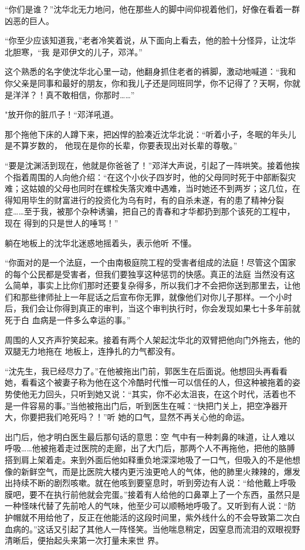 \documentclass{article}
\begin{document}
“你们是谁？”沈华北无力地问，他在那些人的脚中间仰视着他们，好像在看着一群凶恶的巨人。

“你至少应该知道我，”老者冷笑着说，从下面向上看去，他的脸十分怪异，让沈华北胆寒，“我
是邓伊文的儿子，邓洋。” 

这个熟悉的名字使沈华北心里一动，他翻身抓住老者的裤脚，激动地喊道：“我和你父亲是同事和最好的朋友，你和我儿子还是同班同学，你不记得了？天啊，你就是洋洋？！真不敢相信，你那时……”


\newpage

"放开你的脏爪子！“邓洋吼道。 

那个拖他下床的人蹲下来，把凶悍的脸凑近沈华北说：“听着小子，冬眠的年头儿是不算岁数的，
他现在是你的长辈，你要表现出对长辈的尊敬。” 

“要是沈渊活到现在，他就是你爸爸了！”邓洋大声说，引起了一阵哄笑。接着他挨个指着周围的人向他介绍：“在这个小伙子四岁时，他的父母同时死于中部断裂灾难；这姑娘的父母也同时在螺栓失落灾难中遇难，当时她还不到两岁；这几位，在得知用毕生的财富进行的投资化为乌有时，有的自杀未遂，有的患了精神分裂症……至于我，被那个杂种诱骗，把自己的青春和才华都扔到那个该死的工程中，现在
得到的只是世人的唾骂！” 

躺在地板上的沈华北迷惑地摇着头，表示他听
不懂。 

“你面对的是一个法庭，一个由南极庭院工程的受害者组成的法庭！尽管这个国家的每个公民都是受害者，但我们要独享这种惩罚的快感。真正的法庭
\newpage
当然没有这么简单，事实上比你们那时还要复杂得多，所以我们才不会把你送到那里去，让他们和那些律师扯上一年屁话之后宣布你无罪，就像他们对你儿子那样。一个小时后，我们会让你得到真正的审判，当这个审判执行时，你会发现如果七十多年前就死于白
血病是一件多么幸运的事。” 

周围的人又齐声狞笑起来。接着有两个人架起沈华北的双臂把他向门外拖去，他的双腿无力地拖在
地板上，连挣扎的力气都没有。 

“沈先生，我已经尽力了。”在他被拖出门前，郭医生在后面说。他想回头再看看她，看看这个被妻子称为他在这个冷酷时代惟一可以信任的人，但这种被拖着的姿势使他无力回头，只听到她又说：“其实，你不必太沮丧，在这个时代，活着也不是一件容易的事。”当他被拖出门后，听到医生在喊：“快把门关上，把空净器开大，你要把我们呛死吗？！”听
她的口气，显然不再关心他的命运。 

出门后，他才明白医生最后那句话的意思：空
\newpage
气中有一种刺鼻的味道，让人难以呼吸……他被拖着走过医院的走廊，出了大门后，那两个人不再拖他，把他的胳膊搭到肩上架着走。来到外面后他如释重负地深深地吸了一口气，但吸入的不是他想像的新鲜空气，而是比医院大楼内更污浊更呛人的气体，他的肺里火辣辣的，爆发出持续不断的剧烈咳嗽。就在他咳到要窒息时，听到旁边有人说：“给他戴上呼吸膜吧，要不在执行前他就会完蛋。”接着有人给他的口鼻罩上了一个东西，虽然只是一种怪味代替了先前呛人的气味，他至少可以顺畅地呼吸了。又听到有人说：“防护帽就不用给他了，反正在他能活的这段时间里，紫外线什么的不会导致第二次白血病的。”这话又引起了其他人一阵怪笑。当他喘息稍定，因窒息而流泪的双眼视野清晰后，便抬起头来第一次打量未来世
界。 
\end{document}
